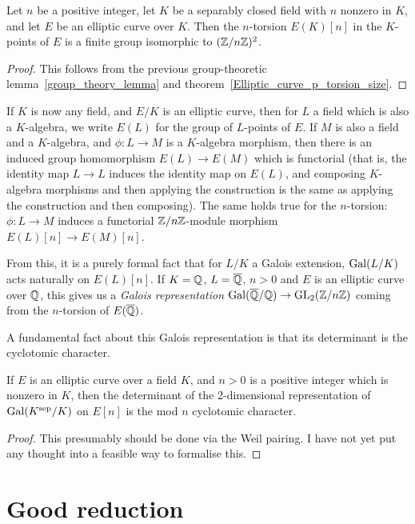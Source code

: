 \begin{corollary}\label{Elliptic_curve_n_torsion_2d}
  Let $n$ be a positive integer, let $K$ be a separably closed
  field with $n$ nonzero in $K$, and let $E$ be an elliptic curve over $K$. Then the $n$-torsion $E(K)[n]$ 
  in the $K$-points of $E$ is a finite group isomorphic to $(\mathbb{Z}/n\mathbb{Z})^2$.
\end{corollary}
\begin{proof}
  This follows from the previous group-theoretic lemma~\ref{group_theory_lemma} and
  theorem~\ref{Elliptic_curve_p_torsion_size}.
\end{proof}

If $K$ is now any field, and $E/K$ is an elliptic curve, then for $L$ a field which is
also a $K$-algebra, we write $E(L)$ for the group of $L$-points of $E$. If $M$ is also
a field and a $K$-algebra, and $\phi:L\to M$ is a $K$-algebra morphism, then there is
an induced group homomorphism $E(L)\to E(M)$ which is functorial (that is,
the identity map $L\to L$ induces the identity map on $E(L)$, and composing $K$-algebra
morphisms and then applying the construction is the same as applying the construction
and then composing). The same holds true for the $n$-torsion: $\phi : L\to M$ induces
a functorial $\mathbb{Z}/n\mathbb{Z}$-module morphism $E(L)[n]\to E(M)[n]$.

From this, it is a purely formal fact that for $L/K$ a Galois extension,
$\operatorname{Gal}(L/K)$ acts naturally on $E(L)[n]$. If $K=\mathbb{Q}$, $L=\overline{\mathbb{Q}}$, $n>0$ and $E$ is an elliptic
curve over $\mathbb{Q}$, this gives us a \emph{Galois representation} $\operatorname{Gal}(\overline{\mathbb{Q}}/\mathbb{Q})\to\operatorname{GL}_2(\mathbb{Z}/n\mathbb{Z})$
coming from the $n$-torsion of $E(\overline{\mathbb{Q}})$.

A fundamental fact about this Galois representation is that its determinant is the
cyclotomic character.

\begin{theorem}\label{Elliptic_curve_det_p_torsion} If $E$ is an 
  elliptic curve over a field $K$, and $n>0$ is a positive integer which is nonzero in $K$, then the 
  determinant of the 2-dimensional representation of $\operatorname{Gal}(K^{\operatorname{sep}}/K)$ on $E[n]$ is the 
  mod $n$ cyclotomic character.
\end{theorem}
\begin{proof}
  This presumably should be done via the Weil pairing. I have not yet put any thought into a feasible way to formalise this.
\end{proof}

\section{Good reduction}

